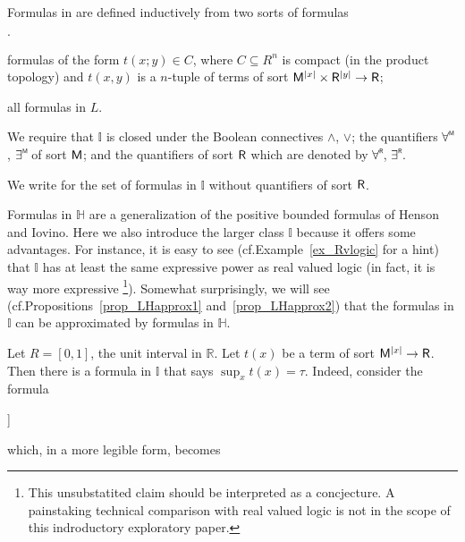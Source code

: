 \documentclass[11pt,oneside]{amsart}
\newcommand{\mylabel}[1]{{#1}\hfill}
\renewenvironment{itemize}
  {\begin{list}{$\cdot$}{%
  \setlength{\parskip}{0mm}
  \setlength{\topsep}{.2\baselineskip}
  \setlength{\rightmargin}{0mm}
  \setlength{\listparindent}{0mm}
  \setlength{\itemindent}{0mm}
  \setlength{\labelwidth}{3ex}
  \setlength{\itemsep}{.2\baselineskip}
  \setlength{\parsep}{.2\baselineskip}
  \setlength{\partopsep}{0mm}
  \setlength{\labelsep}{1ex}
  \setlength{\leftmargin}{\labelwidth+\labelsep}
  \let\makelabel\mylabel}}{%
\end{list}}
\renewcommand*{\emph}[1]{%
   \smash{\tikz[baseline]\node[rectangle, fill=teal!25, rounded corners, inner xsep=0.5ex, inner ysep=0.2ex, anchor=base, minimum height = 2.7ex]{#1};}}
\begin{document}
\begin{definition}\label{def_LL}
  Formulas in \emph{$\mathds{I}$\/} are defined inductively from two sorts of \emph{$\mathds{I}$-atomic\/} formulas
  \begin{itemize}
  \item[i.] formulas of the form $t(x;y)\in C$, where $C\subseteq R^n$ is compact (in the product topology) and $t(x,y)$ is a $n$-tuple of terms of sort ${\sf M}^{|x|}\times {\sf R}^{|y|}\to {\sf R}$; 
  \item[ii.] all formulas in $L$.
  \end{itemize}
  We require that $\mathds{I}$ is closed under the Boolean connectives $\wedge$, $\vee$; the quantifiers $\forallM$, $\existsM $ of sort ${\sf M}$; and the quantifiers of sort ${\sf R}$ which are denoted by $\forallR $, $\existsR$.

  We write \emph{$\mathds{H}$ \/} for the set of formulas in $\mathds{I}$ without quantifiers of sort ${\sf R}$.
\end{definition}

Formulas in $\mathds{H}$ are a generalization of the positive bounded formulas of Henson and Iovino.
Here we also introduce the larger class $\mathds{I}$ because it offers some advantages. 
For instance, it is easy to see (cf.\@ Example~\ref{ex_Rvlogic} for a hint) that $\mathds{I}$ has at least the same expressive power as real valued logic (in fact, it is way more expressive%
\footnote{This unsubstatited claim should be interpreted as a concjecture.
A painstaking technical comparison with real valued logic is not in the scope of this indroductory exploratory paper.}).
Somewhat surprisingly, we will see (cf.\@ Propositions~\ref{prop_LHapprox1} and~\ref{prop_LHapprox2}) that the formulas in $\mathds{I}$ can be approximated by formulas in $\mathds{H}$.

\begin{example}\label{ex_Rvlogic}
  Let $R=[0,1]$, the unit interval in $\mathds{R}$.
  Let $t(x)$ be a term of sort ${\sf M}^{|x|}\to {\sf R}$.
  Then there is a formula in $\mathds{I}$ that says $\sup_{x} t(x)=\tau$.
  Indeed, consider the formula

  {\wedge}{\forallR \varepsilon \Big[\varepsilon\in\{0\}\ \vee\ \existsM x\ \big[\tau\dotminus (t(x)+\varepsilon)\in\{0\}\big]\Big]}

  which, in a more legible form, becomes

\end{example}
\end{document}
